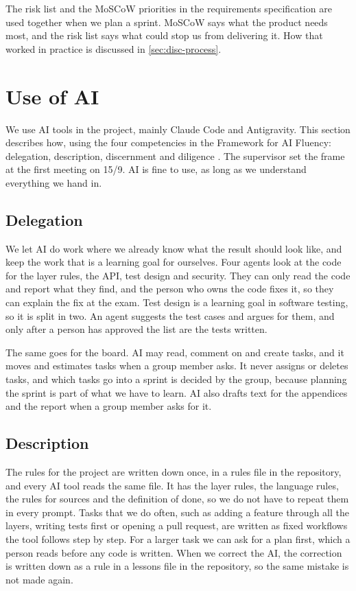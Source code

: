 The risk list and the MoSCoW priorities in the requirements specification are used
together when we plan a sprint. MoSCoW says what the product needs most, and the
risk list says what could stop us from delivering it. How that worked in practice is discussed in
\autoref{sec:disc-process}.

\section{Use of AI}\label{sec:method-ai}

We use AI tools in the project, mainly Claude Code and Antigravity. This section
describes how, using the four competencies in the Framework for AI Fluency:
delegation, description, discernment and diligence
\cite{dakan-feller-ai-fluency}. The supervisor set the frame at the first meeting on
15/9. AI is fine to use, as long as we understand everything we hand in.

\subsection{Delegation}

We let AI do work where we already know what the result should look like, and keep
the work that is a learning goal for ourselves. Four agents look at the code for the
layer rules, the API, test design and security. They can only read the code and report
what they find, and the person who owns the code fixes it, so they can explain the fix
at the exam. Test
design is a learning goal in software testing, so it is split in two. An agent
suggests the test cases and argues for them, and only after a person has approved the
list are the tests written.

The same goes for the board. AI may read, comment on and create tasks, and it moves
and estimates tasks when a group member asks. It never assigns or deletes tasks, and
which tasks go into a sprint is decided by the group, because planning the sprint is
part of what we have to learn. AI also drafts text for the appendices and the report when a group
member asks for it.

\subsection{Description}

The rules for the project are written down once, in a rules file in the repository,
and every AI tool reads the same file. It has the layer rules, the language rules,
the rules for sources and the definition of done, so we do not have to repeat them in
every prompt. Tasks that we do often, such as adding a feature through all the
layers, writing tests first or opening a pull request, are written as fixed workflows
the tool follows step by step. For a larger task we can ask for a plan first, which a
person reads before any code is written. When we correct the AI, the correction is written down as
a rule in a lessons file in the repository, so the same mistake is not made again.

